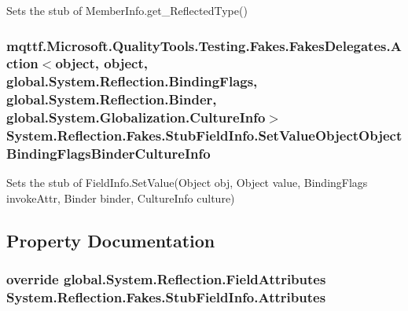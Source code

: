 Sets the stub of Member\-Info.\-get\-\_\-\-Reflected\-Type()

\hypertarget{class_system_1_1_reflection_1_1_fakes_1_1_stub_field_info_afac138fc56cd081d2e96679ef295764a}{
\subsubsection[{Set\-Value\-Object\-Object\-Binding\-Flags\-Binder\-Culture\-Info}]{\setlength{\rightskip}{0pt plus 5cm}mqttf.\-Microsoft.\-Quality\-Tools.\-Testing.\-Fakes.\-Fakes\-Delegates.\-Action$<$object, object, global.\-System.\-Reflection.\-Binding\-Flags, global.\-System.\-Reflection.\-Binder, global.\-System.\-Globalization.\-Culture\-Info$>$ System.\-Reflection.\-Fakes.\-Stub\-Field\-Info.\-Set\-Value\-Object\-Object\-Binding\-Flags\-Binder\-Culture\-Info}}\label{class_system_1_1_reflection_1_1_fakes_1_1_stub_field_info_afac138fc56cd081d2e96679ef295764a}


Sets the stub of Field\-Info.\-Set\-Value(\-Object obj, Object value, Binding\-Flags invoke\-Attr, Binder binder, Culture\-Info culture)



\subsection{Property Documentation}
\hypertarget{class_system_1_1_reflection_1_1_fakes_1_1_stub_field_info_aec3ac521e187a4b99e18ef67ebf96130}{
\subsubsection[{Attributes}]{\setlength{\rightskip}{0pt plus 5cm}override global.\-System.\-Reflection.\-Field\-Attributes System.\-Reflection.\-Fakes.\-Stub\-Field\-Info.\-Attributes\hspace{0.3cm}{\ttfamily [get]}}}\label{class_system_1_1_reflection_1_1_fakes_1_1_stub_field_info_aec3ac521e187a4b99e18ef67ebf96130}


